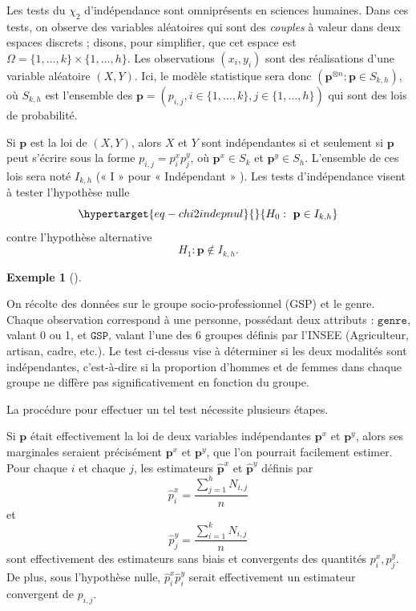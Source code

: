 \documentclass[
  10,
  letterpaper,
  DIV=11,
  numbers=noendperiod]{scrreport}
\theoremstyle{plain}
\theoremstyle{definition}
\theoremstyle{plain}
\theoremstyle{definition}
\theoremstyle{definition}
\newtheorem{example}{Exemple}[chapter]
\theoremstyle{plain}
\theoremstyle{remark}
\begin{document}
Les tests du \(\chi_2\) d'indépendance sont omniprésents en sciences
humaines. Dans ces tests, on observe des variables aléatoires qui sont
des \emph{couples} à valeur dans deux espaces discrets ; disons, pour
simplifier, que cet espace est
\(\Omega = \{1, \dotsc, k\}\times \{1, \dotsc, h\}\). Les observations
\((x_i, y_i)\) sont des réalisations d'une variable aléatoire \((X,Y)\).
Ici, le modèle statistique sera donc
\((\mathbf{p}^{\otimes n} : \mathbf{p} \in S_{k,h})\), où \(S_{k,h}\)
est l'ensemble des
\(\mathbf{p} = (p_{i,j}, i \in \{1,\dots, k\}, j\in \{1, \dots, h\})\)
qui sont des lois de probabilité.

Si \(\mathbf{p}\) est la loi de \((X,Y)\), alors \(X\) et \(Y\) sont
indépendantes si et seulement si \(\mathbf{p}\) peut s'écrire sous la
forme \(p_{i,j} = p^x_i p^y_j\), où \(\mathbf{p}^x \in S_k\) et
\(\mathbf{p}^y \in S_h\). L'ensemble de ces lois sera noté \(I_{k,h}\)
(« I » pour « Indépendant » ). Les tests d'indépendance visent à tester
l'hypothèse nulle
\begin{equation}\protect\hypertarget{eq-chi2indepnul}{}{ H_0 : \mathbf{p}\in I_{k,h}}\label{eq-chi2indepnul}\end{equation}
contre l'hypothèse alternative \[ H_1 : \mathbf{p} \notin I_{k,h}.\]

\begin{example}[]\protect\hypertarget{exm-test}{}\label{exm-test}

On récolte des données sur le groupe socio-professionnel (GSP) et le
genre. Chaque observation correspond à une personne, possédant deux
attributs : \(\mathtt{genre}\), valant 0 ou 1, et \(\mathtt{GSP}\),
valant l'une des 6 groupes définis par l'INSEE (Agriculteur, artisan,
cadre, etc.). Le test ci-dessus vise à déterminer si les deux modalités
sont indépendantes, c'est-à-dire si la proportion d'hommes et de femmes
dans chaque groupe ne diffère pas significativement en fonction du
groupe.

\end{example}

La procédure pour effectuer un tel test nécessite plusieurs étapes.

Si \(\mathbf{p}\) était effectivement la loi de deux variables
indépendantes \(\mathbf{p}^x\) et \(\mathbf{p}^y\), alors ses marginales
seraient précisément \(\mathbf{p}^x\) et \(\mathbf{p}^y\), que l'on
pourrait facilement estimer. Pour chaque \(i\) et chaque \(j\), les
estimateurs \(\hat{\mathbf{p}}^x\) et \(\hat{\mathbf{p}}^y\) définis par
\[\hat{p}^x_i = \frac{\sum_{j=1}^h N_{i,j}}{n}\] et
\[\hat{p}^y_j = \frac{\sum_{i=1}^k N_{i,j}}{n}\] sont effectivement des
estimateurs sans biais et convergents des quantités \(p^x_i, p^y_j\). De
plus, sous l'hypothèse nulle, \(\hat{p}^x_i \hat{p}^y_i\) serait
effectivement un estimateur convergent de \(p_{i,j}\).
\end{document}
